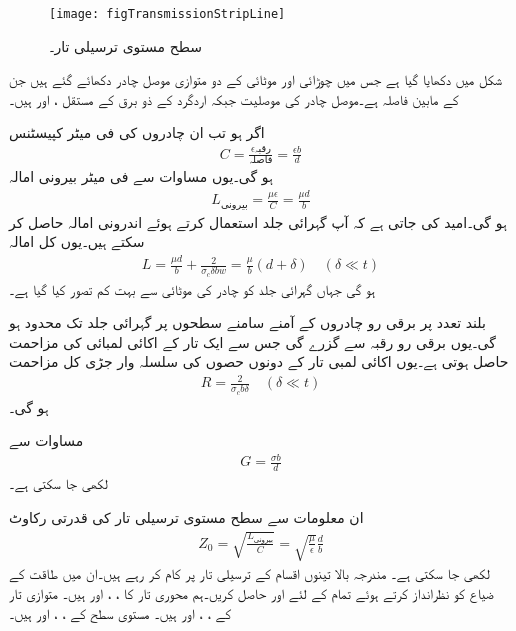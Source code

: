 \begin{figure}
\centering
\texttt{[image: figTransmissionStripLine]}
\caption{سطح مستوی ترسیلی تار۔}
\label{شکل_ترسیلی_سطح_مستوی}
\end{figure}

شکل  میں  دکھایا گیا ہے جس میں  چوڑائی اور  موٹائی کے دو متوازی موصل چادر دکھائے گئے ہیں جن کے مابین فاصلہ  ہے۔موصل چادر کی موصلیت  جبکہ اردگرد کے ذو برق کے مستقل ،  اور  ہیں۔

اگر  ہو تب ان چادروں کی فی میٹر کپیسٹنس  
\begin{align}
C=\frac{\epsilon \text{رقبہ}}{ \text{فاصلہ}} = \frac{\epsilon b}{d}
\end{align}
ہو گی۔یوں مساوات  سے فی میٹر بیرونی امالہ
\begin{align}
L_{\text{بیرونی}}=\frac{\mu \epsilon}{C}=\frac{\mu d}{b}
\end{align}
ہو گی۔امید کی جاتی ہے کہ آپ گہرائی جلد استعمال کرتے ہوئے اندرونی امالہ حاصل کر سکتے ہیں۔یوں کل امالہ
\begin{align}
L=\frac{\mu d}{b}+\frac{2}{\sigma_c \delta b w}=\frac{\mu}{b} (d+\delta) \quad (\delta \ll t)
\end{align}
ہو گی جہاں گہرائی جلد کو چادر کی موٹائی سے بہت کم تصور کیا گیا ہے۔

بلند تعدد پر برقی رو چادروں کے آمنے سامنے  سطحوں پر گہرائی جلد تک محدود ہو گی۔یوں برقی رو رقبہ  سے گزرے گی جس سے ایک تار کے اکائی لمبائی کی مزاحمت  حاصل ہوتی ہے۔یوں اکائی لمبی تار کے دونوں حصوں کی سلسلہ وار جڑی کل مزاحمت
\begin{align}
R=\frac{2}{\sigma_c b \delta} \quad (\delta \ll t)
\end{align}
ہو گی۔ 

مساوات  سے
\begin{align}
G=\frac{\sigma b}{d}
\end{align}
لکھی جا سکتی ہے۔

ان معلومات سے سطح مستوی ترسیلی تار کی قدرتی رکاوٹ
\begin{align}
Z_0=\sqrt{\frac{L_{\text{بیرونی}}}{C}}=\sqrt{\frac{\mu}{\epsilon}} \frac{d}{b}
\end{align}
لکھی جا سکتی ہے۔
مندرجہ بالا تینوں اقسام کے ترسیلی تار  پر کام کر رہے ہیں۔ان میں طاقت کے ضیاع کو نظرانداز کرتے ہوئے تمام کے لئے  اور  حاصل کریں۔ہم محوری تار کا ، ،  اور  ہیں۔ متوازی تار کے ، ،  اور  ہیں۔ مستوی سطح کے ، ،  اور  ہیں۔

